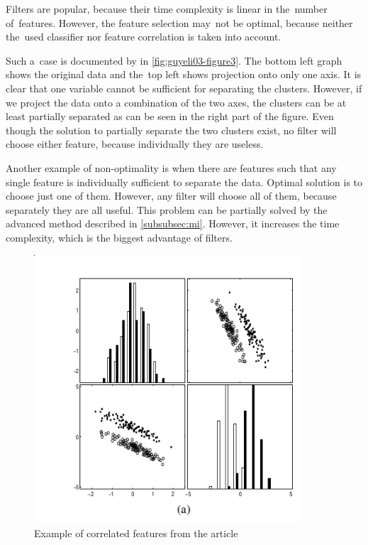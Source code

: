 Filters are popular, because their time complexity is linear in the~number of~features.
However, the feature selection may~not be optimal,
because neither the~used classifier nor feature correlation is taken into account.

Such a~case is documented by \citet{GuyEli03} in \autoref{fig:guyeli03-figure3}.
The bottom left graph shows the original data and the~top left shows projection onto only one axis.
It is clear that one variable cannot be sufficient for separating the clusters.
However, if we project the data onto a combination of the two axes,
the clusters can be at least partially separated as can be seen in the right part of the figure.
Even though the solution to partially separate the two clusters exist,
no filter will choose either feature, because individually they are useless.

Another example of non-optimality is
when there are features such that any single feature is individually sufficient to separate the data.
Optimal solution is  to choose just one of them.
However, any filter will choose all of them, because separately they are all useful.
This problem can be partially solved by the advanced method described in \autoref{subsubsec:mi}.
However, it increases the time complexity, which is the biggest advantage of filters.



 

\begin{figure}[ht]\centering
\includegraphics[width=100mm]{../img/guyeli_figure3.png}
\caption{Example of correlated features from the article}
\label{fig:guyeli03-figure3}
\end{figure}

